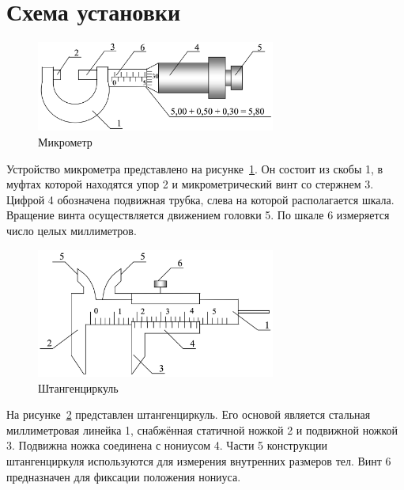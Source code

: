 \section{Схема установки}

\begin{figure}[h]
	\begin{center}
		\includegraphics[width=0.7\textwidth]{pictures/PictureThree}
		\caption{Микрометр}\label{PicThree}
	\end{center}
\end{figure}

Устройство микрометра представлено на рисунке~\ref{PicThree}. Он состоит из скобы 1, в муфтах которой находятся упор 2 и микрометрический винт со стержнем 3. Цифрой 4 обозначена подвижная трубка, слева на которой располагается шкала. Вращение винта осуществляется движением головки 5. По шкале 6 измеряется число целых миллиметров.

\begin{figure}[h]
	\begin{center}
		\includegraphics[width=0.7\textwidth]{pictures/PictureFour}
		\caption{Штангенциркуль}\label{PicFour}
	\end{center}
\end{figure}

На рисунке~\ref{PicFour} представлен штангенциркуль. Его основой является стальная миллиметровая линейка 1, снабжённая статичной ножкой 2 и подвижной ножкой 3. Подвижна ножка соединена с нониусом 4. Части 5 конструкции штангенциркуля используются для измерения внутренних размеров тел. Винт 6 предназначен для фиксации положения нониуса. 